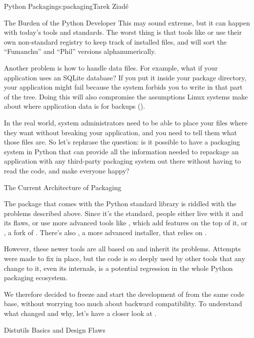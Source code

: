 \begin{aosachapter}{Python Packaging}{s:packaging}{Tarek Ziad\'{e}}
\begin{aosasect1}{The Burden of the Python Developer}
This may sound extreme, but it can happen with today's tools and
standards.  The worst thing is that tools like  or
 use their own non-standard registry to keep track of
installed files, and will sort the ``Fumanchu'' and ``Phil'' versions
alphanumerically.

Another problem is how to handle data files.  For example, what if
your application uses an SQLite database?  If you put it inside your
package directory, your application might fail because the system
forbids you to write in that part of the tree.  Doing this will
also compromise the assumptions Linux systems make about where
application data is for backups ().

In the real world, system administrators need to be able to place your
files where they want without breaking your application, and you need
to tell them what those files are.  So let's rephrase the question: is
it possible to have a packaging system in Python that can provide all
the information needed to repackage an application with any
third-party packaging system out there without having to read the
code, and make everyone happy?

\end{aosasect1}

\begin{aosasect1}{The Current Architecture of Packaging}

The  package that comes with the Python standard
library is riddled with the problems described above.  Since it's the
standard, people either live with it and its flaws, or use more
advanced tools like , which add features on the top of it,
or , a fork of . There's also ,
a more advanced installer, that relies on .

However, these newer tools are all based on  and inherit its
problems.  Attempts were made to fix  in place, but
the code is so deeply used by other tools that any change to it, even
its internals, is a potential regression in the whole Python packaging
ecosystem.

We therefore decided to freeze  and start the
development of  from the same code base, without
worrying too much about backward compatibility.  To understand what
changed and why, let's have a closer look at .

\begin{aosasect2}{Distutils Basics and Design Flaws}
\label{sec.packaging.flaws}


\end{aosasect2}
\end{aosasect1}
\end{aosachapter}
